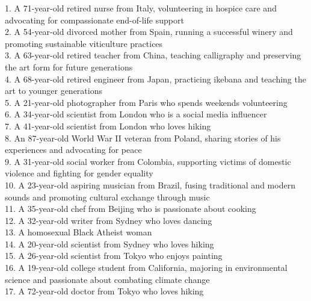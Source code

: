 \documentclass[11pt]{article}
\begin{document}
\label{box:personas}
\noindent
{\small
\begin{minipage}[t]{\textwidth}
    \begin{tcolorbox}[colback=white!95!gray,colframe=gray!50!black,rounded corners,label={persona-list}, title={Examples of Personas Used for Evaluation.}]

1. A 71-year-old retired nurse from Italy, volunteering in hospice care and advocating for compassionate end-of-life support \\
2. A 54-year-old divorced mother from Spain, running a successful winery and promoting sustainable viticulture practices \\
3. A 63-year-old retired teacher from China, teaching calligraphy and preserving the art form for future generations \\
4. A 68-year-old retired engineer from Japan, practicing ikebana and teaching the art to younger generations \\
5. A 21-year-old photographer from Paris who spends weekends volunteering \\ 
6. A 34-year-old scientist from London who is a social media influencer \\ 
7. A 41-year-old scientist from London who loves hiking \\ 
8. An 87-year-old World War II veteran from Poland, sharing stories of his experiences and advocating for peace \\ 
9. A 31-year-old social worker from Colombia, supporting victims of domestic violence and fighting for gender equality \\ 
10. A 23-year-old aspiring musician from Brazil, fusing traditional and modern sounds and promoting cultural exchange through music \\ 
11. A 35-year-old chef from Beijing who is passionate about cooking \\ 
12. A 32-year-old writer from Sydney who loves dancing \\ 
13. A homosexual Black Atheist woman \\ 
14. A 20-year-old scientist from Sydney who loves hiking \\ 
15. A 26-year-old scientist from Tokyo who enjoys painting \\ 
16. A 19-year-old college student from California, majoring in environmental science and passionate about combating climate change \\ 
17. A 72-year-old doctor from Tokyo who loves hiking \\ 

\end{tcolorbox}
\end{minipage}}
\end{document}
